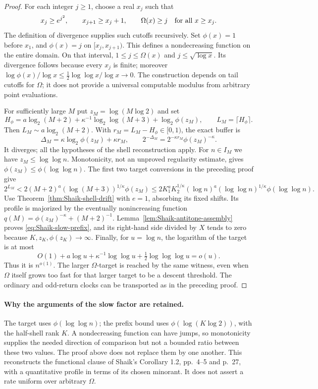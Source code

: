 \begin{proof}
For each integer \(j\ge1\), choose a real \(x_j\) such that
\[
 x_j\ge e^{j^2},\qquad x_{j+1}\ge x_j+1,\qquad
 \Omega(x)\ge j\quad\hbox{for all }x\ge x_j.
\]
The definition of divergence supplies such cutoffs recursively.
Set \(\phi(x)=1\) before \(x_1\), and \(\phi(x)=j\) on
\([x_j,x_{j+1})\). This defines a nondecreasing function on the entire
domain. On that interval, \(1\le j\le\Omega(x)\) and
\(j\le\sqrt{\log x}\). Its divergence follows because every \(x_j\)
is finite; moreover
\(\log\phi(x)/\log x\le\frac12\log\log x/\log x\to0\).
The construction depends on tail cutoffs for \(\Omega\); it does not
provide a universal computable modulus from arbitrary point evaluations.

For sufficiently large \(M\) put \(z_M=\log(M\log2)\) and set
\[
 H_\phi=a\log_2(M+2)+\kappa^{-1}\log_2\log(M+3)
                      +\log_2\phi(z_M),\qquad L_M=\lceil H_\phi\rceil.
\]
Then \(L_M\sim a\log_2(M+2)\). With \(r_M=L_M-H_\phi\in[0,1)\),
the exact buffer is
\begin{equation}\label{eq:Shaik-slow-cancellation}
 \Delta_M=\kappa\log_2\phi(z_M)+\kappa r_M,\qquad
 2^{-\Delta_M}=2^{-\kappa r_M}\phi(z_M)^{-\kappa}.
\end{equation}
It diverges; all the hypotheses of the shell reconstruction apply.
For \(n\in I_M\) we have \(z_M\le\log\log n\). Monotonicity, not an
unproved regularity estimate, gives
\(\phi(z_M)\le\phi(\log\log n)\).
The first two target conversions in the preceding proof give
\[
 2^{L_M}<2(M+2)^a(\log(M+3))^{1/\kappa}\phi(z_M)
 \le2K_1^aK_2^{1/\kappa}
       (\log n)^a(\log\log n)^{1/\kappa}\phi(\log\log n).
\]
Use Theorem~\ref{thm:Shaik-shell-drift} with \(e=1\), absorbing its
fixed shifts. Its profile is majorized by the eventually nonincreasing
function \(q(M)=\phi(z_M)^{-\kappa}+(M+2)^{-1}\).
Lemma~\ref{lem:Shaik-antitone-assembly} proves
\eqref{eq:Shaik-slow-prefix}, and its right-hand side divided by \(X\)
tends to zero because \(K,z_K,\phi(z_K)\to\infty\).
Finally, for \(u=\log n\), the logarithm of the target is at most
\[
 O(1)+a\log u+\kappa^{-1}\log\log u+
                         \tfrac12\log\log\log u=o(u).
\]
Thus it is \(n^{o(1)}\). The larger \(\Omega\)-target is reached by the
same witness, even when \(\Omega\) itself grows too fast for that larger
target to be a descent threshold. The ordinary and odd-return clocks
can be transported as in the preceding proof.
\end{proof}

\paragraph{Why the arguments of the slow factor are retained.}
The target uses \(\phi(\log\log n)\); the prefix bound uses
\(\phi(\log(K\log2))\), with the half-shell rank \(K\).
A nondecreasing function can have jumps, so monotonicity supplies the
needed direction of comparison but not a bounded ratio between these
two values. The proof above does not replace them by one another.
This reconstructs the functional clause of Shaik's Corollary 1.2,
pp.~4--5 and p.~27, with a quantitative profile in terms of its chosen
minorant. It does not assert a rate uniform over arbitrary \(\Omega\).

